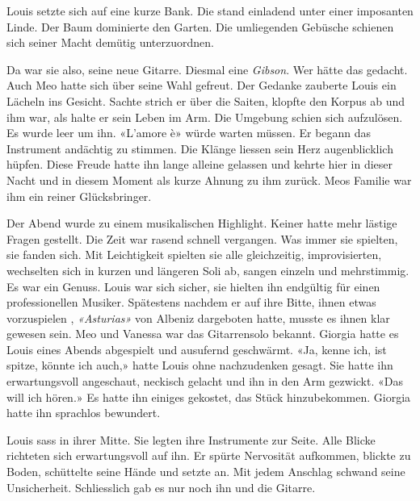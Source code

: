 \sectionbreak 

Louis setzte sich auf eine kurze Bank. Die stand einladend unter einer
imposanten Linde. Der Baum dominierte den Garten. Die umliegenden Gebüsche schienen sich seiner Macht demütig unterzuordnen.

Da war sie also, seine neue Gitarre. Diesmal eine \emph{Gibson}. Wer
hätte das gedacht. Auch Meo hatte sich über seine Wahl gefreut. Der
Gedanke zauberte Louis ein Lächeln ins Gesicht. Sachte strich er über
die Saiten, klopfte den Korpus ab und ihm war, als halte er sein
Leben im Arm. 
Die Umgebung schien sich aufzulösen. Es wurde leer um ihn. 
«L’amore è» würde warten müssen. 
Er begann das Instrument andächtig zu stimmen. Die Klänge liessen
sein Herz augenblicklich hüpfen. Diese Freude hatte ihn lange alleine
gelassen und kehrte hier in dieser Nacht und in diesem Moment als kurze
Ahnung zu ihm zurück. Meos Familie war ihm ein reiner 
Glücksbringer.

\sectionbreak

Der Abend wurde zu einem musikalischen Highlight. Keiner hatte mehr
lästige Fragen gestellt. Die Zeit war rasend schnell vergangen. Was
immer sie spielten, sie fanden sich. Mit Leichtigkeit spielten sie alle
gleichzeitig, improvisierten, wechselten sich in kurzen und längeren
Soli ab, sangen einzeln und mehrstimmig. Es war ein Genuss.
Louis war sich sicher, sie hielten ihn endgültig für einen
professionellen Musiker. Spätestens nachdem er auf ihre Bitte, ihnen etwas vorzuspielen
, \emph{«Asturias»} von Albeniz dargeboten hatte, musste es
ihnen klar gewesen sein. Meo und Vanessa war das Gitarrensolo bekannt.
Giorgia hatte es Louis eines Abends abgespielt und ausufernd geschwärmt.
«Ja, kenne ich, ist spitze, könnte ich auch,» hatte Louis ohne
nachzudenken gesagt. Sie hatte ihn erwartungsvoll angeschaut, 
neckisch gelacht und ihn in den Arm gezwickt.
«Das will ich hören.»
Es hatte ihn einiges gekostet, das Stück hinzubekommen. Giorgia hatte ihn sprachlos bewundert.

Louis sass in ihrer Mitte. Sie legten ihre Instrumente zur Seite. Alle
Blicke richteten sich erwartungsvoll auf ihn. Er spürte Nervosität aufkommen, blickte zu
Boden, schüttelte seine Hände und setzte an. 
Mit jedem Anschlag schwand seine Unsicherheit. Schliesslich gab es nur noch ihn und
die Gitarre.



